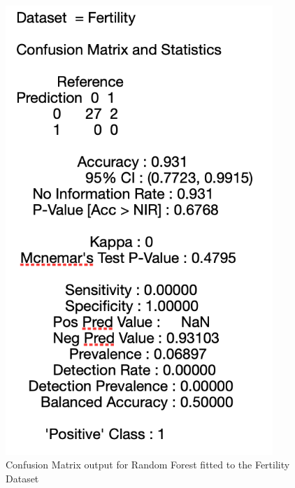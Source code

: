 \begin{figure}[!htbp]
    \centering
    \begin{minipage}{0.45\textwidth}
        \centering
        \includegraphics[width=0.9\textwidth]{ThesisTemplate/appendix/images/Chapter5Appendix/ConfusionMatrix/Fertility.png} 
        \caption{Confusion Matrix output for Random Forest fitted to the Fertility Dataset}
        \label{fig:my_label}
    \end{minipage}\hfill
    \begin{minipage}{0.45\textwidth}
        \centering

\end{minipage}
\end{figure}
